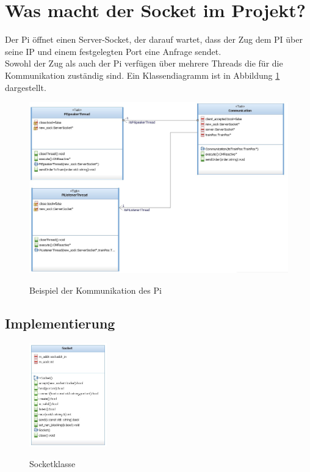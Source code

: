 \section{Was macht der Socket im Projekt?}

Der Pi öffnet einen Server-Socket, der darauf wartet, dass der Zug dem PI über seine IP und einem festgelegten Port eine Anfrage sendet.\\
Sowohl der Zug als auch der Pi verfügen über mehrere Threads die für die Kommunikation zuständig sind. Ein Klassendiagramm ist in Abbildung \ref{pic:pi_communication} dargestellt.\\

\begin{figure}
	\caption{Beispiel der Kommunikation des Pi}
	\includegraphics[width=1\textwidth]{content/pictures/socket/pi_speaker_listener.jpg}
	\label{pic:pi_communication}
\end{figure}

\subsection{Implementierung}

\begin{figure}
	\caption{Socketklasse}
	\centering
	\includegraphics[width=0.3\textwidth]{content/pictures/socket/socket.jpg}
	\label{pic:socket}
\end{figure}

